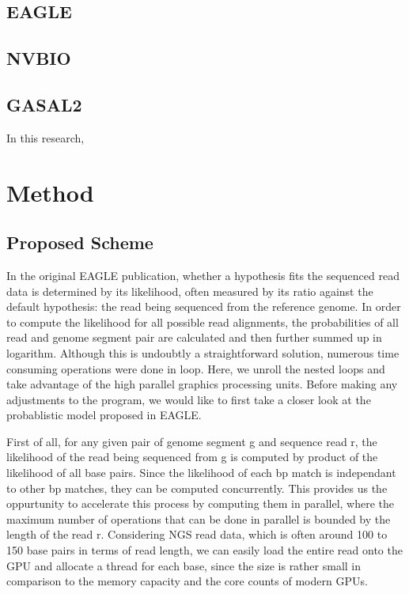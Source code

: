\documentclass{PHlab-thesis}
\begin{document}
\section{EAGLE}
\section{NVBIO}
\section{GASAL2}
In this research, 

\chapter{Method}
\section{Proposed Scheme}
In the original EAGLE publication, whether a hypothesis fits the sequenced read data is determined by its likelihood, often measured by its ratio against the default hypothesis: the read being sequenced from the reference genome. In order to compute the likelihood for all possible read alignments, the probabilities of all read and genome segment pair are calculated and then further summed up in logarithm. Although this is undoubtly a straightforward solution, numerous time consuming operations were done in loop. Here, we unroll the nested loops and take advantage of the high parallel graphics processing units. 
Before making any adjustments to the program, we would like to first take a closer look at the probablistic model proposed in EAGLE.


First of all, for any given pair of genome segment g and sequence read r, the likelihood of the read being sequenced from g is computed by product of the likelihood of all base pairs. Since the likelihood of each bp match is independant to other bp matches, they can be computed concurrently. This provides us the oppurtunity to accelerate this process by computing them in parallel, where the maximum number of operations that can be done in parallel is bounded by the length of the read r. Considering NGS read data, which is often around 100 to 150 base pairs in terms of read length, we can easily load the entire read onto the GPU and allocate a thread for each base, since the size is rather small in comparison to the memory capacity and the core counts of modern GPUs.
\end{document}
